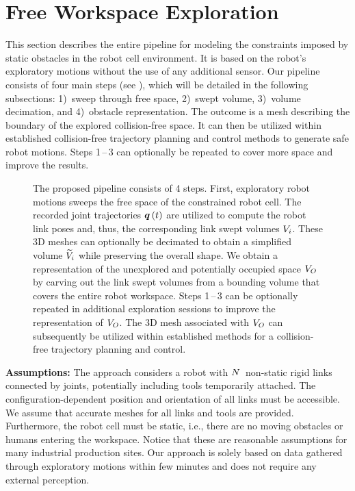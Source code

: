 \section{Free Workspace Exploration}
\label{sec:freeWorkspaceExploration}
\noindent This section describes the entire pipeline for modeling the constraints imposed by static obstacles in the robot cell environment.
It is based on the robot's exploratory motions without the use of any additional sensor.
Our pipeline consists of four main steps (see ), 
which will be detailed in the following subsections: 
1)~sweep through free space,
2)~swept volume,
3)~volume decimation, and
4)~obstacle representation.
The outcome is a mesh describing the boundary of the explored collision-free space. 
It can then be utilized within established collision-free trajectory planning and control methods to generate safe robot motions. 
Steps 1\,--\,3 can optionally be repeated to cover more space and improve the results.


\begin{figure*}[!t]
	\centering
	
	\caption{The proposed pipeline consists of 4 steps. %
	First, exploratory robot motions %
	sweeps the free space of the constrained robot cell. 
	The recorded joint trajectories ${\bm{q}\left( t \right)}$ are utilized to compute the robot link poses and, thus, 
	the corresponding link swept volumes ${V_{i}}$. 
	These 3D meshes can optionally be decimated to obtain a simplified volume ${\widetilde{V}_{i}}$ while preserving the overall shape. 
	We obtain a representation of the unexplored and potentially occupied space ${V_{O}}$
	by carving out the link swept volumes from a bounding volume that covers the entire robot workspace.
	Steps 1\,--\,3 can be optionally repeated in additional exploration sessions to improve the representation of ${V_{O}}$. 
	The 3D mesh associated with ${V_{O}}$ can subsequently be utilized 
	within established methods for a collision-free trajectory planning and control.
	}
	\label{fig:pipeline}
\end{figure*}

\textbf{Assumptions:}
The approach considers a robot with ${N}$~non-static rigid links connected by joints, 
potentially including tools temporarily attached. 
The configuration-dependent position and orientation of all links must be accessible.
We assume that accurate meshes for all links and tools are provided.
Furthermore, 
the robot cell must be static,
i.e., 
there are no moving obstacles or humans entering the workspace.
Notice that these are reasonable assumptions for many industrial production sites.
Our approach is solely based on data gathered through exploratory motions within few minutes and does not require any external perception.

